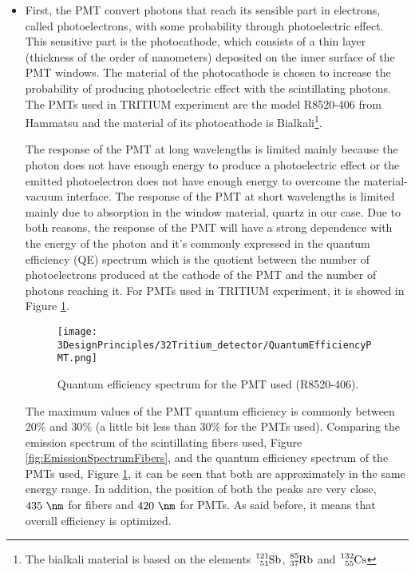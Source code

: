 \begin{itemize}
\item{} First, the PMT convert photons that reach its sensible part in electrons, called photoelectrons, with some probability through photoelectric effect. This sensitive part is the photocathode, which consists of a thin layer (thickness of the order of nanometers) deposited on the inner surface of the PMT windows. The material of the photocathode is chosen to increase the probability of producing photoelectric effect with the scintillating photons. The PMTs used in TRITIUM experiment are the model R8520-406 from Hammatsu \cite{DataSheetPMTs} and the material of its photocathode is Bialkali\footnote{The bialkali material is based on the elements $\ce{^{121}_{51}Sb}$, $\ce{^{85}_{37}Rb}$ and $\ce{^{132}_{55}Cs}$}.

The response of the PMT at long wavelengths is limited mainly because the photon does not have enough energy to produce a photoelectric effect or the emitted photoelectron does not have enough energy to overcome the material-vacuum interface. The response of the PMT at short wavelengths is limited mainly due to absorption in the window material, quartz in our case. Due to both reasons, the response of the PMT will have a strong dependence with the energy of the photon and it's commonly expressed in the quantum efficiency (QE) spectrum which is the quotient between the number of photoelectrons produced at the cathode of the PMT and the number of photons reaching it. For PMTs used in TRITIUM experiment, it is showed in Figure \ref{fig:QuantumEfficiencyPMT}.

\begin{figure}[htbp]
\centering
\texttt{[image: 3DesignPrinciples/32Tritium\_detector/QuantumEfficiencyPMT.png]}
\caption{Quantum efficiency spectrum for the PMT used (R8520-406).\label{fig:QuantumEfficiencyPMT}~\cite{DataSheetPMTs}}
\end{figure}

The maximum values of the PMT quantum efficiency is commonly between $20\%$ and $30\%$ \cite{Knoll} (a little bit less than $30\%$ for the PMTs used). Comparing the emission spectrum of the scintillating fibers used, Figure \ref{fig:EmissionSpectrumFibers}, and the quantum efficiency spectrum of the PMTs used, Figure \ref{fig:QuantumEfficiencyPMT}, it can be seen that both are approximately in the same energy range. In addition, the position of both the peaks are very close, $435~\nm$ for fibers and $420~\nm$ for PMTs. As said before, it means that overall efficiency is optimized.


\end{itemize}

